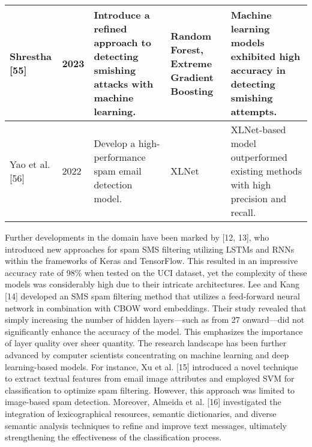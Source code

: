 \begin{table*}
\begin{tabular}{|p{3cm}|p{1cm}|p{5cm}|p{3.5cm}|p{4cm}|}
Shrestha [55] & 2023 & Introduce a refined approach to detecting smishing attacks with machine learning. & Random Forest, Extreme Gradient Boosting & Machine learning models exhibited high accuracy in detecting smishing attempts. \\ \hline
Yao et al. [56] & 2022 & Develop a high-performance spam email detection model. & XLNet & XLNet-based model outperformed existing methods with high precision and recall. \\ \hline
\end{tabular}
\end{table*}



Further developments in the domain have been marked by [12, 13], who introduced new approaches for spam SMS filtering utilizing LSTMs and RNNs within the frameworks of Keras and TensorFlow. This resulted in an impressive accuracy rate of 98\% when tested on the UCI dataset, yet the complexity of these models was considerably high due to their intricate architectures.  Lee and Kang [14] developed an SMS spam filtering method that utilizes a feed-forward neural network in combination with CBOW word embeddings. Their study revealed that simply increasing the number of hidden layers—such as from 27 onward—did not significantly enhance the accuracy of the model. This emphasizes the importance of layer quality over sheer quantity. The research landscape has been further advanced by computer scientists concentrating on machine learning and deep learning-based models. For instance, Xu et al. [15] introduced a novel technique to extract textual features from email image attributes and employed SVM for classification to optimize spam filtering. However, this approach was limited to image-based spam detection. Moreover, Almeida et al. [16] investigated the integration of lexicographical resources, semantic dictionaries, and diverse semantic analysis techniques to refine and improve text messages, ultimately strengthening the effectiveness of the classification process.

